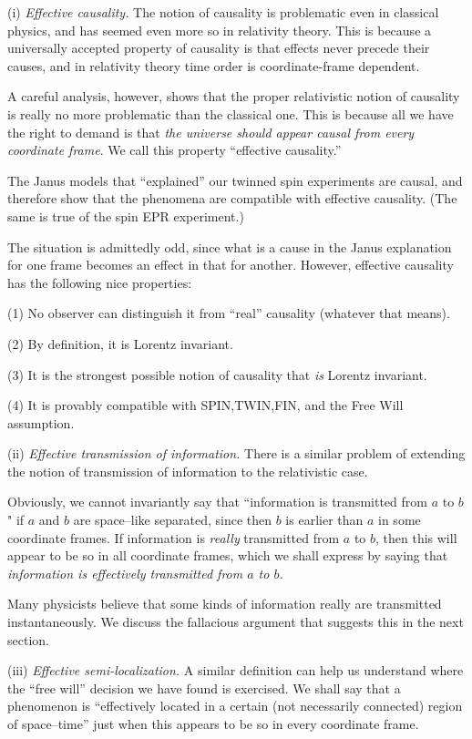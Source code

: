 \documentclass[12pt]{amsart}
\begin{document}
(i) {\it Effective causality.} The notion of causality is problematic even in 
classical physics, and has seemed even more so in relativity theory. This is
because a universally accepted property of causality is that effects never
precede their causes, and in relativity theory time order is coordinate-frame
dependent.

A careful analysis, however, shows that the proper relativistic notion of
causality is really no more problematic than the classical one. 
This is because all we have the right to demand is that
{\it the universe should appear causal from every coordinate frame}.
We call this property ``effective causality.''

The Janus models that ``explained'' our twinned
spin experiments are causal, and therefore show that the phenomena are 
compatible with effective causality. 
(The same is true of the spin EPR experiment.)

The situation is admittedly odd, since what is a cause in 
the Janus explanation for one frame becomes an effect in that for another.
However, effective causality has the following nice properties:

(1) No observer can distinguish it from ``real'' causality 
(whatever that means).
   
(2) By definition, it is Lorentz invariant.
   
(3) It is the strongest possible notion of causality that 
{\it is} Lorentz invariant.
   
(4) It is provably compatible with SPIN,TWIN,FIN, and the Free Will assumption. 

(ii) {\it Effective transmission of information.} 
There is a similar problem of
extending the notion of transmission of information to the relativistic case.

Obviously, we cannot invariantly say that 
``information is transmitted from $a$ to $b$"
if $a$ and $b$ are space--like separated, 
since then $b$ is earlier than $a$ in some coordinate frames.
If information is {\it really} transmitted from $a$ to $b$, 
then this will appear to be so in all coordinate frames,
which we shall express by saying that 
{\em information is effectively transmitted from $a$ to $b$.}

Many physicists believe that some kinds of information really are transmitted
instantaneously.  We discuss the fallacious argument that suggests this in the
next section.

 (iii) {\it Effective semi-localization.} 
A similar definition can help us understand
where the ``free will'' decision we have found is exercised. 
We shall say that a phenomenon is ``effectively located in a certain 
(not necessarily connected) region of space--time'' 
just when this appears to be so in every coordinate frame.
\end{document}
